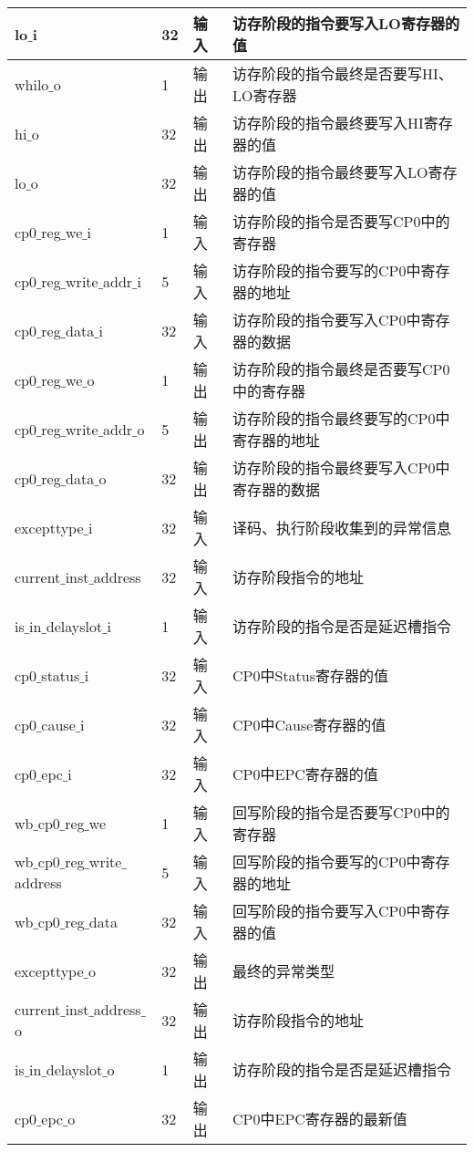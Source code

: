 \begin{longtable}{|l|l|l|l|}
		\hline
		lo$\_$i & 32 & 输入 & 访存阶段的指令要写入LO寄存器的值 \\
		\hline
		whilo$\_$o & 1 & 输出 & 访存阶段的指令最终是否要写HI、LO寄存器 \\
		\hline
		hi$\_$o & 32 & 输出 & 访存阶段的指令最终要写入HI寄存器的值 \\
		\hline
		lo$\_$o & 32 & 输出 & 访存阶段的指令最终要写入LO寄存器的值 \\
		\hline
		cp0$\_$reg$\_$we$\_$i & 1 & 输入 & 访存阶段的指令是否要写CP0中的寄存器 \\
		\hline
		cp0$\_$reg$\_$write$\_$addr$\_$i & 5 & 输入 & 访存阶段的指令要写的CP0中寄存器的地址 \\
		\hline
		cp0$\_$reg$\_$data$\_$i & 32 & 输入 & 访存阶段的指令要写入CP0中寄存器的数据 \\
		\hline
		cp0$\_$reg$\_$we$\_$o & 1 & 输出 & 访存阶段的指令最终是否要写CP0中的寄存器 \\
		\hline
		cp0$\_$reg$\_$write$\_$addr$\_$o & 5 & 输出 & 访存阶段的指令最终要写的CP0中寄存器的地址 \\
		\hline
		cp0$\_$reg$\_$data$\_$o & 32 & 输出 & 访存阶段的指令最终要写入CP0中寄存器的数据 \\
		\hline
		excepttype$\_$i & 32 & 输入 & 译码、执行阶段收集到的异常信息 \\
		\hline
		current$\_$inst$\_$address & 32 & 输入 & 访存阶段指令的地址 \\
		\hline
		is$\_$in$\_$delayslot$\_$i & 1 & 输入 & 访存阶段的指令是否是延迟槽指令 \\
		\hline
		cp0$\_$status$\_$i & 32 & 输入 & CP0中Status寄存器的值 \\
		\hline
		cp0$\_$cause$\_$i & 32 & 输入 & CP0中Cause寄存器的值 \\
		\hline
		cp0$\_$epc$\_$i & 32 & 输入 & CP0中EPC寄存器的值 \\
		\hline
		wb$\_$cp0$\_$reg$\_$we & 1 & 输入 & 回写阶段的指令是否要写CP0中的寄存器 \\
		\hline
		wb$\_$cp0$\_$reg$\_$write$\_$address & 5 & 输入 & 回写阶段的指令要写的CP0中寄存器的地址 \\
		\hline
		wb$\_$cp0$\_$reg$\_$data & 32 & 输入 & 回写阶段的指令要写入CP0中寄存器的值 \\
		\hline
		excepttype$\_$o & 32 & 输出 & 最终的异常类型 \\
		\hline
		current$\_$inst$\_$address$\_$o & 32 & 输出 & 访存阶段指令的地址 \\
		\hline
		is$\_$in$\_$delayslot$\_$o & 1 & 输出 & 访存阶段的指令是否是延迟槽指令 \\
		\hline
		cp0$\_$epc$\_$o & 32 & 输出 & CP0中EPC寄存器的最新值 \\
		\hline
	\end{longtable}
